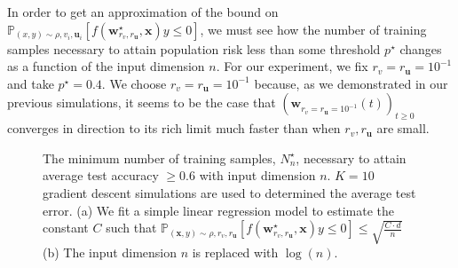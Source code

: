 \documentclass{article}
\begin{document}
In order to get an approximation of the bound on $\mathbb{P}_{(x,y) \sim \rho, v_i, \boldsymbol{u}_i}[f(\boldsymbol{w}_{r_v, r_{\boldsymbol{u}}}^{\star}, \boldsymbol{x})y \leq 0]$, we must see how the number of training samples necessary to attain population risk less than some threshold $p^{\star}$ changes as a function of the input dimension $n$. For our experiment, we fix $r_{v} = r_{\boldsymbol{u}} = 10^{-1}$ and take $p^{\star} = 0.4$. We choose $r_{v} = r_{\boldsymbol{u}} = 10^{-1}$ because, as we demonstrated in our previous simulations, it seems to be the case that $(\boldsymbol{w}_{r_v = r_{\boldsymbol{u}} = 10^{-1}}(t))_{t \geq 0}$ converges in direction to its rich limit much faster than when $r_{v}, r_{\boldsymbol{u}}$ are small. 

\begin{figure}[H]
\centering
{}\hfill
{}
\caption{The minimum number of training samples, $N_n^{\star}$, necessary to attain average test accuracy $\geq 0.6$ with input dimension $n$. $K=10$ gradient descent simulations are used to determined the average test error. (a) We fit a simple linear regression model to estimate the constant $C$ such that $\mathbb{P}_{(\boldsymbol{x}, y) \sim \rho, r_v, r_{\boldsymbol{u}}}[f(\boldsymbol{w}_{r_v, r_{\boldsymbol{u}}}^{\star}, \boldsymbol{x})y \leq 0] \leq \sqrt{\frac{C \cdot d}{n}}$ (b) The input dimension $n$ is replaced with $\log(n)$.}\label{fig:numsamples}
\end{figure}
\end{document}
